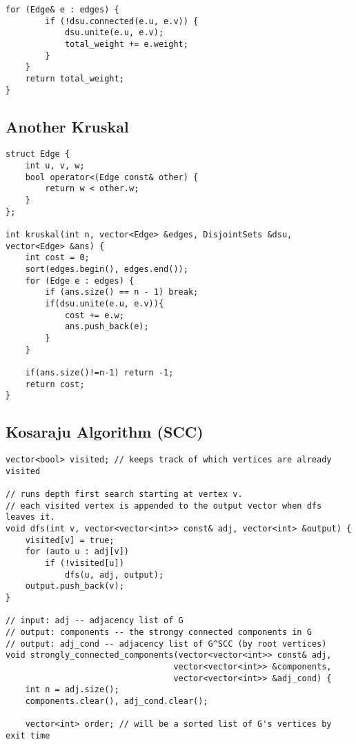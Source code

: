 \documentclass[10pt]{article}
\begin{document}
\begin{multicols*}{2}
\begin{lstlisting}[style=compactcpp]
    for (Edge& e : edges) {
        if (!dsu.connected(e.u, e.v)) {
            dsu.unite(e.u, e.v);
            total_weight += e.weight;
        }
    }
    return total_weight;
}
\end{lstlisting}

\subsection{Another Kruskal}

\begin{lstlisting}[style=compactcpp]
struct Edge {
    int u, v, w;
    bool operator<(Edge const& other) {
        return w < other.w;
    }
};
 
int kruskal(int n, vector<Edge> &edges, DisjointSets &dsu, vector<Edge> &ans) {
    int cost = 0;
    sort(edges.begin(), edges.end());
    for (Edge e : edges) {
        if (ans.size() == n - 1) break;
        if(dsu.unite(e.u, e.v)){
            cost += e.w;
            ans.push_back(e);
        }
    }
 
    if(ans.size()!=n-1) return -1;
    return cost;
}
\end{lstlisting}

\subsection{Kosaraju Algorithm (SCC)}

\begin{lstlisting}[style=compactcpp]
vector<bool> visited; // keeps track of which vertices are already visited

// runs depth first search starting at vertex v.
// each visited vertex is appended to the output vector when dfs leaves it.
void dfs(int v, vector<vector<int>> const& adj, vector<int> &output) {
    visited[v] = true;
    for (auto u : adj[v])
        if (!visited[u])
            dfs(u, adj, output);
    output.push_back(v);
}

// input: adj -- adjacency list of G
// output: components -- the strongy connected components in G
// output: adj_cond -- adjacency list of G^SCC (by root vertices)
void strongly_connected_components(vector<vector<int>> const& adj,
                                  vector<vector<int>> &components,
                                  vector<vector<int>> &adj_cond) {
    int n = adj.size();
    components.clear(), adj_cond.clear();

    vector<int> order; // will be a sorted list of G's vertices by exit time


\end{lstlisting}
\end{multicols*}
\end{document}
